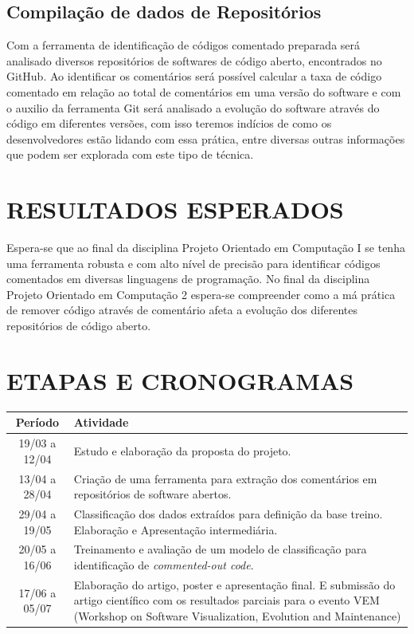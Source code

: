 \documentclass{abnt}
\begin{document}
\section{Compilação de dados de Repositórios}

Com a ferramenta de identificação de códigos comentado preparada será analisado 
diversos repositórios de softwares de código aberto, encontrados
no GitHub. Ao identificar os comentários será possível calcular a taxa de 
código comentado em relação ao total de comentários em uma versão do 
software e com o auxilio da ferramenta Git será analisado a evolução do 
software através do código em diferentes versões, com isso teremos 
indícios de como os desenvolvedores estão lidando com essa prática, entre 
diversas outras informações que podem ser explorada com este tipo
de técnica.

\chapter{RESULTADOS ESPERADOS}

Espera-se que ao final da disciplina Projeto Orientado em Computação I se 
tenha uma ferramenta robusta e com alto nível de precisão para identificar 
códigos comentados em diversas linguagens de programação. No final da 
disciplina Projeto Orientado em Computação 2 espera-se compreender como a 
má prática de remover código através de comentário afeta a evolução dos 
diferentes repositórios de código aberto.

\chapter{ETAPAS E CRONOGRAMAS}

\begin{table}[ht]
  \centering
  \label{tab:Table1}
  \smallskip
  \begin{tabular}{cp{11cm}}
  Período & Atividade\\[0.5ex]
  \hline
  19/03 a 12/04 & Estudo e elaboração da proposta do projeto. \\[0.5ex]

  13/04 a 28/04 & Criação de uma ferramenta para extração dos comentários em 
  repositórios de software abertos.\\[0.5ex]
  
  29/04 a 19/05 & Classificação dos dados extraídos para definição da base 
  treino. Elaboração e Apresentação intermediária. \\[0.5ex]

  20/05 a 16/06 & Treinamento e avaliação de um modelo de classificação para 
  identificação de \textit{commented-out code}. \\[0.5ex]

  17/06 a 05/07 & Elaboração do artigo, poster e apresentação final. E submissão 
  do artigo científico com os resultados parciais para o evento VEM 
  (Workshop on Software Visualization, Evolution and Maintenance) \\[0.5ex]
  \end{tabular}
  \end{table}
\end{document}
